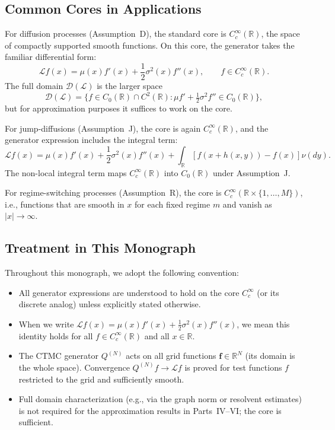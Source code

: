 \documentclass[11pt,a4paper,openany]{book}
\theoremstyle{definition}
\theoremstyle{plain}
\theoremstyle{remark}
\newcommand{\1}{\mathbbm{1}}
\newcommand{\R}{\mathbb{R}}
\begin{document}
\subsection{Common Cores in Applications}

For diffusion processes (Assumption~D), the standard core is $C_{c}^{\infty}(\R)$, the space of compactly supported smooth functions. On this core, the generator takes the familiar differential form:
\[
\mathcal{L} f(x) = \mu(x) f'(x) + \frac{1}{2} \sigma^{2}(x) f''(x), \qquad f \in C_{c}^{\infty}(\R).
\]
The full domain $\mathcal{D}(\mathcal{L})$ is the larger space
\[
\mathcal{D}(\mathcal{L}) = \{f \in C_{0}(\R) \cap C^{2}(\R) : \mu f' + \tfrac{1}{2}\sigma^{2} f'' \in C_{0}(\R)\},
\]
but for approximation purposes it suffices to work on the core.

For jump-diffusions (Assumption~J), the core is again $C_{c}^{\infty}(\R)$, and the generator expression includes the integral term:
\[
\mathcal{L} f(x) = \mu(x) f'(x) + \frac{1}{2} \sigma^{2}(x) f''(x) + \int_{\R} [f(x+h(x,y)) - f(x)] \nu(dy).
\]
The non-local integral term maps $C_{c}^{\infty}(\R)$ into $C_{0}(\R)$ under Assumption~J.

For regime-switching processes (Assumption~R), the core is $C_{c}^{\infty}(\R \times \{1,\ldots,M\})$, i.e., functions that are smooth in $x$ for each fixed regime $m$ and vanish as $|x| \to \infty$.

\subsection{Treatment in This Monograph}

Throughout this monograph, we adopt the following convention:
\begin{itemize}
    \item All generator expressions are understood to hold on the core $C_{c}^{\infty}$ (or its discrete analog) unless explicitly stated otherwise.
    \item When we write $\mathcal{L} f(x) = \mu(x) f'(x) + \frac{1}{2}\sigma^{2}(x) f''(x)$, we mean this identity holds for all $f \in C_{c}^{\infty}(\R)$ and all $x \in \R$.
    \item The CTMC generator $Q^{(N)}$ acts on all grid functions $\mathbf{f} \in \R^{N}$ (its domain is the whole space). Convergence $Q^{(N)} f \to \mathcal{L} f$ is proved for test functions $f$ restricted to the grid and sufficiently smooth.
    \item Full domain characterization (e.g., via the graph norm or resolvent estimates) is not required for the approximation results in Parts~IV--VI; the core is sufficient.
\end{itemize}
\end{document}
